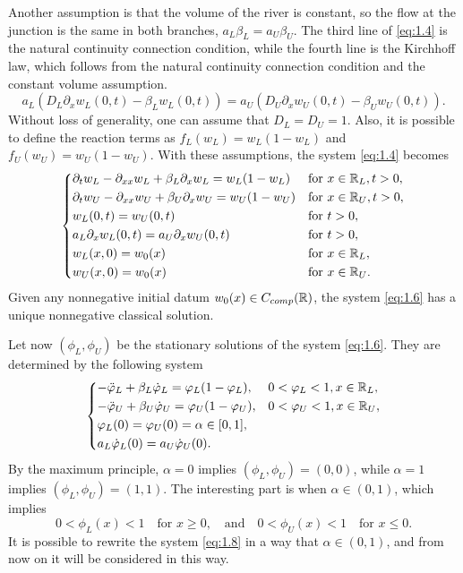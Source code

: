Another assumption is that the volume of the river is constant, so the flow at the junction is the same in both branches, \(a_L \beta_L = a_U \beta_U\). The third line of \eqref{eq:1.4} is the natural continuity connection condition, while the fourth line is the Kirchhoff law, which follows from the natural continuity connection condition and the constant volume assumption.
\[
    a_L \left(D_L \partial_x w_L(0, t) - \beta_L w_L(0, t)\right) = a_U \left(D_U \partial_x w_U(0, t) - \beta_U w_U(0, t)\right).
\]
Without loss of generality, one can assume that \(D_L = D_U = 1\). Also, it is possible to define the reaction terms as \(f_L(w_L) = w_L(1 - w_L)\) and \(f_U(w_U) = w_U(1 - w_U)\).
With these assumptions, the system \eqref{eq:1.4} becomes
\begin{equation}
    \begin{dcases}
        \partial_t w_L - \partial_{xx}w_L + \beta_L \partial_x w_L = w_L(1 - w_L) & \text{for } x \in \mathbb{R}_L, t > 0, \\
        \partial_t w_U - \partial_{xx}w_U + \beta_U \partial_x w_U = w_U(1 - w_U) & \text{for } x \in \mathbb{R}_U, t > 0, \\
        w_L(0, t) = w_U(0, t) & \text{for } t > 0, \\
        a_L \partial_x w_L(0, t) = a_U \partial_x w_U(0, t) & \text{for } t > 0, \\
        w_L(x, 0) = w_{0}(x) & \text{for } x \in \mathbb{R}_L, \\
        w_U(x, 0) = w_{0}(x) & \text{for } x \in \mathbb{R}_U.
    \end{dcases}
    \label{eq:1.6}
\end{equation}
Given any nonnegative initial datum \(w_0(x) \in C_{comp}(\mathbb{R})\), the system \eqref{eq:1.6} has a unique nonnegative classical solution.

Let now \((\phi_L, \phi_U)\) be the stationary solutions of the system \eqref{eq:1.6}. They are determined by the following system
\begin{equation}
    \begin{dcases}
        - \ddot{\varphi}_L + \beta_L \dot{\varphi}_L = \varphi_L(1 - \varphi_L), & 0 < \varphi_L < 1, x \in \mathbb{R}_L, \\
        - \ddot{\varphi}_U + \beta_U \dot{\varphi}_U = \varphi_U(1 - \varphi_U), & 0 < \varphi_U < 1, x \in \mathbb{R}_U, \\
        \varphi_L(0) = \varphi_U(0) = \alpha \in [0, 1], \\
        a_L \dot{\varphi}_L(0) = a_U \dot{\varphi}_U(0).
    \end{dcases}
    \label{eq:1.8}
\end{equation}
By the maximum principle, \(\alpha = 0\) implies \((\phi_L, \phi_U) = (0, 0)\), while \(\alpha = 1\) implies \((\phi_L, \phi_U) = (1, 1)\). 
The interesting part is when \(\alpha \in (0, 1)\), which implies 
\[
    0 < \phi_L(x) < 1 \quad \text{for } x \geq 0, \quad \text{and} \quad 0 < \phi_U(x) < 1 \quad \text{for } x \leq 0.
\]
It is possible to rewrite the system \eqref{eq:1.8} in a way that \(\alpha \in (0, 1)\), and from now on it will be considered in this way. 

